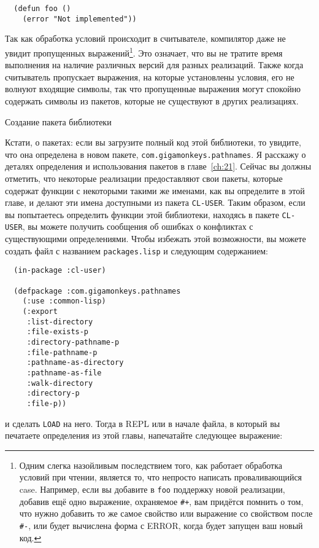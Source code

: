\begin{lstlisting}
  (defun foo ()
    (error "Not implemented"))
\end{lstlisting}

Так как обработка условий происходит в считывателе, компилятор даже не увидит пропущенных
выражений\footnote{Одним слегка назойливым последствием того, как работает обработка
  условий при чтении, является то, что непросто написать проваливающийся case. Например,
  если вы добавите в \lstinline{foo} поддержку новой реализации, добавив ещё одно выражение,
  охраняемое \lstinline!#+!, вам придётся помнить о том, что нужно добавить то же самое
  свойство или выражение со свойством после \lstinline!#-!, или будет вычислена форма с
  ERROR, когда будет запущен ваш новый код.}. Это означает, что вы не тратите время
выполнения на наличие различных версий для разных реализаций. Также когда считыватель
пропускает выражения, на которые установлены условия, его не волнуют входящие символы, так
что пропущенные выражения могут спокойно содержать символы из пакетов, которые не
существуют в других реализациях.

Создание пакета библиотеки

Кстати, о пакетах: если вы загрузите полный код этой библиотеки, то увидите, что она
определена в новом пакете, \lstinline{com.gigamonkeys.pathnames}. Я расскажу о деталях
определения и использования пакетов в главе~\ref{ch:21}. Сейчас вы должны отметить, что некоторые
реализации предоставляют свои пакеты, которые содержат функции с некоторыми такими же
именами, как вы определите в этой главе, и делают эти имена доступными из пакета
\lstinline{CL-USER}. Таким образом, если вы попытаетесь определить функции этой библиотеки,
находясь в пакете \lstinline{CL-USER}, вы можете получить сообщения об ошибках о конфликтах с
существующими определениями. Чтобы избежать этой возможности, вы можете создать файл с
названием \lstinline{packages.lisp} и следующим содержанием:

\begin{lstlisting}
  (in-package :cl-user)

  (defpackage :com.gigamonkeys.pathnames
    (:use :common-lisp)
    (:export
     :list-directory
     :file-exists-p
     :directory-pathname-p
     :file-pathname-p
     :pathname-as-directory
     :pathname-as-file
     :walk-directory
     :directory-p
     :file-p))
\end{lstlisting}

\noindent{}и сделать \lstinline{LOAD} на него. Тогда в REPL или в начале файла, в который вы
печатаете определения из этой главы, напечатайте следующее выражение:

